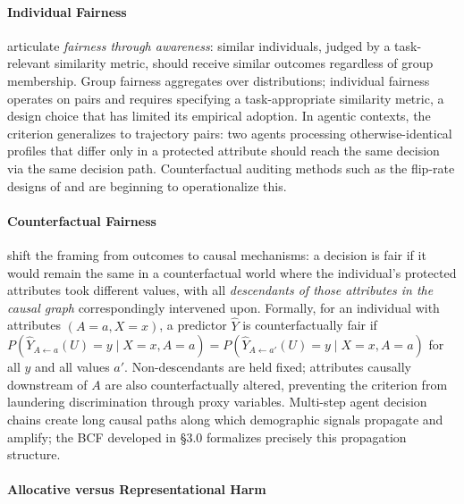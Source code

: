 \documentclass[acmsmall,nonacm]{acmart}
\begin{document}
\paragraph{Individual Fairness}

\cite{dwork2012fairness} articulate \emph{fairness through awareness}: similar individuals, judged by a task-relevant similarity metric, should receive similar outcomes regardless of group membership. Group fairness aggregates over distributions; individual fairness operates on pairs and requires specifying a task-appropriate similarity metric, a design choice that has limited its empirical adoption. In agentic contexts, the criterion generalizes to trajectory pairs: two agents processing otherwise-identical profiles that differ only in a protected attribute should reach the same decision via the same decision path. Counterfactual auditing methods such as the flip-rate designs of \cite{basu2026names} and \cite{mayilvaghanan2026counterfactual} are beginning to operationalize this.

\paragraph{Counterfactual Fairness}

\cite{kusner2017counterfactual} shift the framing from outcomes to causal mechanisms: a decision is fair if it would remain the same in a counterfactual world where the individual's protected attributes took different values, with all \emph{descendants of those attributes in the causal graph} correspondingly intervened upon. Formally, for an individual with attributes $(A=a, X=x)$, a predictor $\hat{Y}$ is counterfactually fair if $P(\hat{Y}_{A \leftarrow a}(U) = y \mid X=x, A=a) = P(\hat{Y}_{A \leftarrow a'}(U) = y \mid X=x, A=a)$ for all $y$ and all values $a'$. Non-descendants are held fixed; attributes causally downstream of $A$ are also counterfactually altered, preventing the criterion from laundering discrimination through proxy variables. Multi-step agent decision chains create long causal paths along which demographic signals propagate and amplify; the BCF developed in \S{}3.0 formalizes precisely this propagation structure.

\paragraph{Allocative versus Representational Harm}
\end{document}
